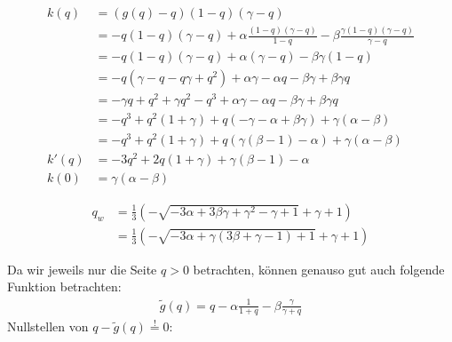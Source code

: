 \documentclass[11pt,a4paper]{article}
\begin{document}
	\begin{align*}
		k(q) &= \left( g\left(q\right) - q \right)(1 - q)(\gamma - q) \\
		&= -q(1 - q) (\gamma - q) + \alpha \frac{(1 - q) (\gamma - q)}{1 - q} - \beta \frac{\gamma (1 - q) (\gamma - q)}{\gamma - q} \\
		&= -q(1 - q)(\gamma - q) + \alpha(\gamma - q) - \beta\gamma(1 - q) \\
		&= -q(\gamma - q - q\gamma + q^2) + \alpha\gamma - \alpha q - \beta\gamma + \beta \gamma q \\
		&= -\gamma q + q^2 + \gamma q^2 - q^3 + \alpha\gamma - \alpha q - \beta\gamma + \beta \gamma q \\
		&= -q^3 + q^2(1 + \gamma) + q(-\gamma -\alpha + \beta \gamma) + \gamma(\alpha - \beta) \\
		&= -q^3 + q^2(1 + \gamma) + q(\gamma(\beta - 1) -\alpha) + \gamma(\alpha - \beta) \\
		k'(q) &= -3q^2 + 2q(1+\gamma) + \gamma(\beta - 1) -\alpha \\
		k(0) &=  \gamma(\alpha - \beta)
	\end{align*}		
	
	\begin{align*}
		q_w &= \frac{1}{3} \left( -\sqrt{-3\alpha + 3\beta\gamma + \gamma^2 - \gamma + 1} + \gamma + 1 \right) \\
		&= \frac{1}{3} \left( -\sqrt{-3\alpha + \gamma(3\beta + \gamma - 1) + 1 } + \gamma + 1 \right)
	\end{align*}
	
	Da wir jeweils nur die Seite \(q > 0\) betrachten, können genauso gut auch folgende Funktion betrachten:
	\begin{align*}
		\tilde{g}(q) = q - \alpha \frac{1}{1+q} - \beta \frac{\gamma}{\gamma + q}
	\end{align*}
	Nullstellen von \(q - \tilde{g}(q) \stackrel{!}{=} 0\):
	
\end{document}
